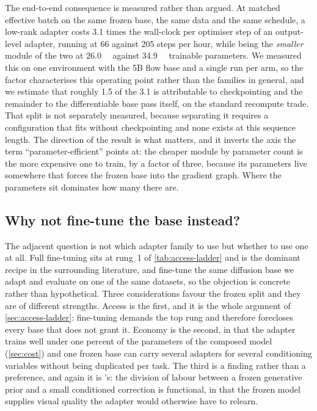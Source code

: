 The end-to-end consequence is measured rather than argued. At matched
effective batch on the same frozen base, the same data and the same
schedule, a low-rank adapter costs \num{3.1} times the wall-clock per
optimiser step of an output-level adapter, running at \num{66} against
\num{205} steps per hour, while being the \emph{smaller} module of the two
at \SI{26.0}{\mega\nothing} against \SI{34.9}{\mega\nothing} trainable
parameters. We measured
this on one environment with the 5B flow base and a single run per arm, so
the factor characterises this operating point rather than the families in
general, and we estimate that roughly \num{1.5} of the \num{3.1} is
attributable to checkpointing and the remainder to the differentiable base
pass itself, on the standard recompute trade. That split is not separately
measured, because separating it requires a configuration that fits without
checkpointing and none exists at this sequence
length. The direction of the result is
what matters, and it inverts the axis the term ``parameter-efficient''
points at: the cheaper module by parameter count is the more expensive one
to train, by a factor of three, because its parameters live somewhere that
forces the frozen base into the gradient graph. Where the parameters sit
dominates how many there are.

\subsection{Why not fine-tune the base instead?}
\label{sec:why-not-finetune}

The adjacent question is not which adapter family to use but whether to use
one at all. Full fine-tuning sits at rung~1 of \cref{tab:access-ladder} and
is the dominant recipe in the surrounding literature, and
\citet{huang2026vid2world} fine-tune the same diffusion base we adapt and
evaluate on one of the same datasets, so the objection is concrete rather
than hypothetical. Three considerations favour the frozen split and they
are of different strengths. Access is the first, and it is the whole
argument of \cref{sec:access-ladder}: fine-tuning demands the top rung and
therefore forecloses every base that does not grant it. Economy is the
second, in that the adapter trains well under one percent of the parameters
of the composed model (\cref{sec:cost}) and one frozen base can carry
several adapters for several conditioning variables without being
duplicated per task. The third is a finding rather than a preference, and
again it is \citeauthor{rigter2024avid}'s: the division of labour between a
frozen generative prior and a small conditioned correction is functional,
in that the frozen model supplies visual quality the adapter would
otherwise have to relearn.

